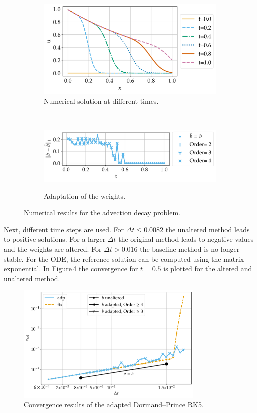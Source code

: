 \documentclass[a4paper]{article}
\numberwithin{equation}{section}
\theoremstyle{plain}
\theoremstyle{definition}
\numberwithin{theorem}{section}
\newcommand{\dt}{{\Delta t}}
\newcommand{\1}{\mathbbm{1}}
\begin{document}
\begin{figure}
\centering
\begin{subfigure}[t]{0.45\textwidth}
\centering
\includegraphics[width=1\textwidth]{plots/Advection_Decay.pdf}
\caption{Numerical solution at different times.}
\label{fig:sol_AdDe}
\end{subfigure}%
~
\begin{subfigure}[t]{0.45\textwidth}
\centering
\includegraphics[width=1\textwidth]{plots/b_Advection_Decay.pdf}\\
\caption{Adaptation of the weights.}
\label{fig:weights_AdDe}
\end{subfigure}
\caption{Numerical results for the advection decay problem.}
\end{figure}


Next, different time steps are used.
For $\dt \leq 0.0082$ the unaltered method leads to positive solutions. For a larger $\dt$ the original method leads to negative values and the weights are altered. For $\dt >0.016$ the baseline method is no longer stable.
For the ODE, the reference solution can be computed using the matrix exponential. 
In Figure\,\ref{fig:conv_expl} the convergence for $t=0.5$ is plotted for the altered and unaltered method.

\begin{figure}[ht]
\centering
\includegraphics[width=0.8\textwidth]{plots/conv_adde.pdf}
\caption{Convergence results of the adapted Dormand--Prince RK5.}
\label{fig:conv_expl}
\end{figure}
\end{document}
